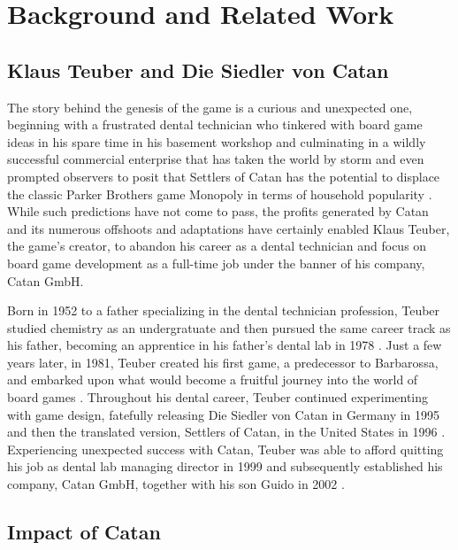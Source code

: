 \documentclass[pageno]{jpaper}
\begin{document}
\begin{doublespacing}
\hypertarget{sec:background_and_related_work}{}
\section{Background and Related Work}

\hypertarget{sec:klaus_teuber_and_die_siedler_von_catan}{}
\subsection{Klaus Teuber and Die Siedler von Catan}

The story behind the genesis of the game is a curious and unexpected one, beginning with a frustrated dental technician who tinkered with board game ideas in his spare time in his basement workshop and culminating in a wildly successful commercial enterprise that has taken the world by storm and even prompted observers to posit that Settlers of Catan has the potential to displace the classic Parker Brothers game Monopoly in terms of household popularity \cite{raphel2014}. While such predictions have not come to pass, the profits generated by Catan and its numerous offshoots and adaptations have certainly enabled Klaus Teuber, the game's creator, to abandon his career as a dental technician and focus on board game development as a full-time job under the banner of his company, Catan GmbH.

Born in 1952 to a father specializing in the dental technician profession, Teuber studied chemistry as an undergratuate and then pursued the same career track as his father, becoming an apprentice in his father's dental lab in 1978 \cite{catanwebabout}. Just a few years later, in 1981, Teuber created his first game, a predecessor to Barbarossa, and embarked upon what would become a fruitful journey into the world of board games \cite{catanwebabout}. Throughout his dental career, Teuber continued experimenting with game design, fatefully releasing Die Siedler von Catan in Germany in 1995 and then the translated version, Settlers of Catan, in the United States in 1996 \cite{raphel2014}. Experiencing unexpected success with Catan, Teuber was able to afford quitting his job as dental lab managing director in 1999 and subsequently established his company, Catan GmbH, together with his son Guido in 2002 \cite{catanwebabout}.

\hypertarget{sec:impact_of_catan}{}
\subsection{Impact of Catan}


\end{doublespacing}
\end{document}
